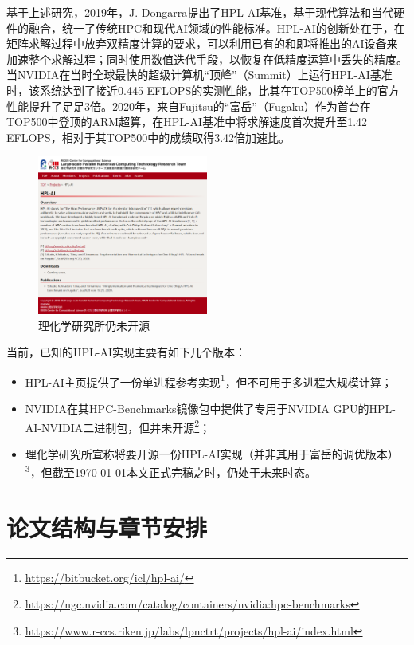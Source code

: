 基于上述研究，2019年，J. Dongarra提出了HPL-AI基准\cite{dongarrahpl}，基于现代算法和当代硬件的融合，统一了传统HPC和现代AI领域的性能标准。HPL-AI的创新处在于，在矩阵求解过程中放弃双精度计算的要求，可以利用已有的和即将推出的AI设备来加速整个求解过程；同时使用数值迭代手段，以恢复在低精度运算中丢失的精度。当NVIDIA在当时全球最快的超级计算机``顶峰''（Summit）上运行HPL-AI基准时，该系统达到了接近0.445 EFLOPS的实测性能，比其在TOP500榜单上的官方性能提升了足足3倍。2020年，来自Fujitsu的``富岳''（Fugaku）作为首台在TOP500中登顶的ARM超算，在HPL-AI基准中将求解速度首次提升至1.42 EFLOPS，相对于其TOP500中的成绩取得3.42倍加速比\cite{DBLP:conf/scala-ws/KudoNII20}。

\begin{figure}
    \centering
    \includegraphics[width=0.5\textwidth]{image/chap01/1}
    \caption{理化学研究所仍未开源}
    \label{理化学研究所仍未开源}
\end{figure}

当前，已知的HPL-AI实现主要有如下几个版本：

\begin{itemize}

    \item HPL-AI主页提供了一份单进程参考实现\footnote{\url{https://bitbucket.org/icl/hpl-ai/}}，但不可用于多进程大规模计算；
    \item NVIDIA在其HPC-Benchmarks镜像包中提供了专用于NVIDIA GPU的HPL-AI-NVIDIA二进制包，但并未开源\footnote{\url{https://ngc.nvidia.com/catalog/containers/nvidia:hpc-benchmarks}}；
    \item 理化学研究所宣称将要开源一份HPL-AI实现（并非其用于富岳的调优版本）\footnote{\url{https://www.r-ccs.riken.jp/labs/lpnctrt/projects/hpl-ai/index.html}}，但截至{\today}本文正式完稿之时，仍处于未来时态。

\end{itemize}

\section{论文结构与章节安排}

